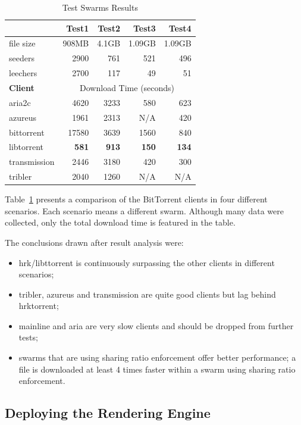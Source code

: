 \begin{table}[ht]
  \centering
  \begin{tabular}{@{}lrrrr@{}}
    \toprule
    & \textbf{Test1} & \textbf{Test2} & \textbf{Test3} &
    \textbf{Test4} \\
    \midrule
    file size & 908MB & 4.1GB & 1.09GB & 1.09GB	\\
    seeders & 2900 & 761 & 521 & 496	\\
    leechers & 2700 & 117 & 49 & 51	\\
    \midrule
    \textbf{Client} & \multicolumn{4}{c}{Download Time (seconds)} \\
    \midrule
    aria2c & 4620 & 3233 & 580 & 623 \\
    azureus & 1961 & 2313 & N/A & 420 \\
    bittorrent & 17580 & 3639 & 1560 & 840 \\
    libtorrent & \textbf{581} & \textbf{913} & \textbf{150} & \textbf{134} \\
    transmission & 2446 & 3180 & 420 & 300 \\
    tribler & 2040 & 1260 & N/A & N/A \\
    \bottomrule
  \end{tabular}
  \caption{Test Swarms Results}
  \label{table:virt-infra:testsw}
\end{table}

Table~\ref{table:virt-infra:testsw} presents a comparison of the BitTorrent
clients in four different scenarios. Each scenario means a different swarm.
Although many data were collected, only the total download time is featured in
the table.

The conclusions drawn after result analysis were:

\begin{itemize}
  \item hrk/libttorrent is continuously surpassing the other clients in 
  different scenarios;
  \item tribler, azureus and transmission are quite good clients but lag 
  behind hrktorrent;
  \item mainline and aria are very slow clients and should be dropped from 
  further tests;
  \item swarms that are using sharing ratio enforcement offer better 
  performance; a file is downloaded at least 4 times faster within a swarm 
  using sharing ratio enforcement.
\end{itemize}

\subsection{Deploying the Rendering Engine}

